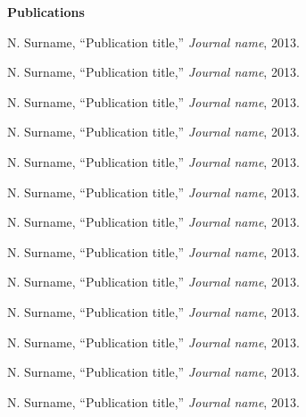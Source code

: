 \label{page:pub}
\begin{center}
\textbf{\large Publications}
\end{center}
\vspace*{25pt}
\begin{enumerate}[{[1]}]

\item N. Surname, ``Publication title,'' \textit{Journal name}, 2013.

\item N. Surname, ``Publication title,'' \textit{Journal name}, 2013.

\item N. Surname, ``Publication title,'' \textit{Journal name}, 2013.

\item N. Surname, ``Publication title,'' \textit{Journal name}, 2013.

\item N. Surname, ``Publication title,'' \textit{Journal name}, 2013.

\item N. Surname, ``Publication title,'' \textit{Journal name}, 2013.

\item N. Surname, ``Publication title,'' \textit{Journal name}, 2013.

\item N. Surname, ``Publication title,'' \textit{Journal name}, 2013.

\item N. Surname, ``Publication title,'' \textit{Journal name}, 2013.

\item N. Surname, ``Publication title,'' \textit{Journal name}, 2013.

\item N. Surname, ``Publication title,'' \textit{Journal name}, 2013.

\item N. Surname, ``Publication title,'' \textit{Journal name}, 2013.

\item N. Surname, ``Publication title,'' \textit{Journal name}, 2013.

\end{enumerate}

\newpage